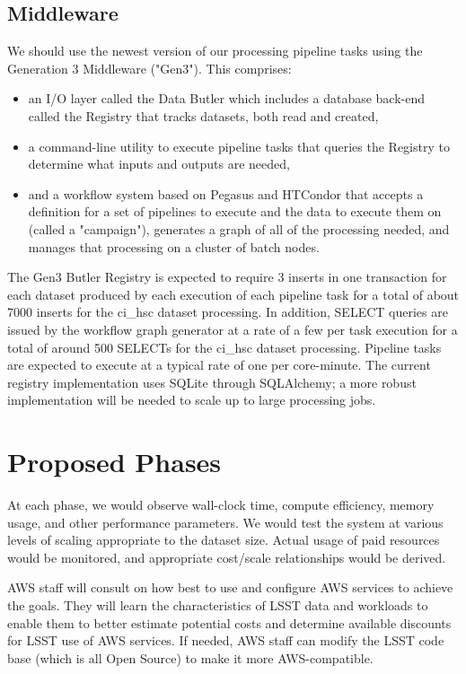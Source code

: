 \subsection{Middleware} \label{sec:drp-middleware}
We should use the newest version of our processing pipeline tasks using the Generation 3 Middleware ("Gen3"). This comprises:
\begin{itemize}
\item an I/O layer called the Data Butler which includes a database back-end called the Registry that tracks datasets, both read and created,
\item a command-line utility to execute pipeline tasks that queries the Registry to determine what inputs and outputs are needed,
\item and a workflow system based on Pegasus and HTCondor that accepts a definition for a set of pipelines to execute and the data to execute them on (called a "campaign"), generates a graph of all of the processing needed, and manages that processing on a cluster of batch nodes.
\end{itemize}

The Gen3 Butler Registry is expected to require 3 inserts in one transaction for each dataset produced by each execution of each pipeline task for a total of about 7000 inserts for the ci\_hsc dataset processing. In addition, SELECT queries are issued by the workflow graph generator at a rate of a few per task execution for a total of around 500 SELECTs for the ci\_hsc dataset processing. Pipeline tasks are expected to execute at a typical rate of one per core-minute. The current registry implementation uses SQLite through SQLAlchemy; a more robust implementation will be needed to scale up to large processing jobs.

\section{Proposed Phases} \label{sec:phases}
At each phase, we would observe wall-clock time, compute efficiency, memory usage, and other performance parameters. We would test the system at various levels of scaling appropriate to the dataset size. Actual usage of paid resources would be monitored, and appropriate cost/scale relationships would be derived.

AWS staff will consult on how best to use and configure AWS services to achieve the goals. They will learn the characteristics of LSST data and workloads to enable them to better estimate potential costs and determine available discounts for LSST use of AWS services. If needed, AWS staff can modify the LSST code base (which is all Open Source) to make it more AWS-compatible.

